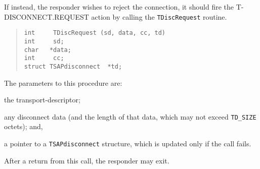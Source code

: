 If instead, the responder wishes to reject the connection,
it should fire the {\sf T-DISCONNECT.REQUEST\/} action by calling the
\verb"TDiscRequest" routine.
\begin{quote}\small\begin{verbatim}
int     TDiscRequest (sd, data, cc, td)
int     sd;
char   *data;
int     cc;
struct TSAPdisconnect  *td;
\end{verbatim}\end{quote}
The parameters to this procedure are:
\begin{describe}\label{TDiscRequest}
\item[\verb"sd":] the transport-descriptor;

\item[\verb"data"/\verb"cc":] any disconnect data
(and the length of that data, which may not exceed \verb"TD_SIZE" octets);
and,

\item[\verb"td":] a pointer to a \verb"TSAPdisconnect" structure, which is
updated only if the call fails.
\end{describe}
After a return from this call, the responder may exit.

